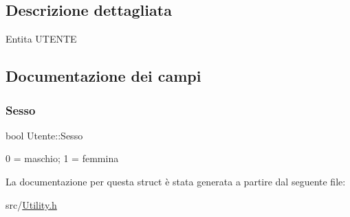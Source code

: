 \subsection{Descrizione dettagliata}
Entita\textquotesingle{} U\+T\+E\+N\+TE 

\subsection{Documentazione dei campi}
\mbox{\label{struct_utente_ad973b65f5d1a9365e9dd93503c12159c}} 
\subsubsection{\texorpdfstring{Sesso}{Sesso}}
{\footnotesize\ttfamily bool Utente\+::\+Sesso}

0 = maschio; 1 = femmina 

La documentazione per questa struct è stata generata a partire dal seguente file\+:\begin{DoxyCompactItemize}
\item 
src/\hyperlink{_utility_8h}{Utility.\+h}\end{DoxyCompactItemize}

